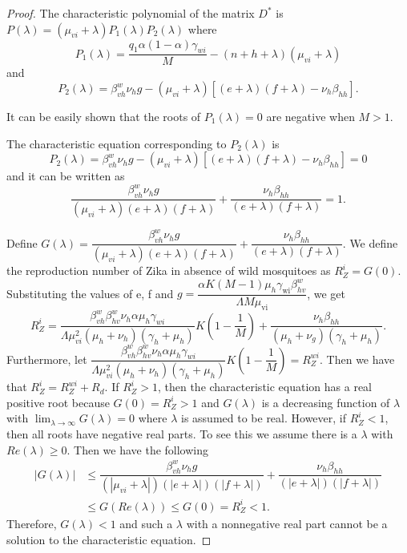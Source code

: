 \documentclass{ws-rv9x6}
\begin{document}
\begin{proof}
The characteristic polynomial of the matrix $D^*$ is $P(\lambda)=(\mu_{vi}+\lambda)P_1(\lambda)P_2(\lambda)$
where $$P_1(\lambda)= \dfrac{q_1\alpha(1-\alpha)\gamma_{wi}}{M}-(n+h+\lambda)(\mu_{vi}+\lambda)$$ and $$P_2(\lambda)=\beta^w_{vh}\nu_h g-(\mu_{vi}+\lambda)[(e+\lambda)(f+\lambda)-\nu_h\beta_{hh}].$$

\noindent It can be easily shown that the roots of $P_1(\lambda)=0$ are negative when $M > 1$.

The characteristic equation corresponding to $P_2(\lambda)$ is 
$$P_2(\lambda)=\beta^w_{vh}\nu_h g-(\mu_{vi}+\lambda)[(e+\lambda)(f+\lambda)-\nu_h\beta_{hh}]=0$$
and it can be written as
$$\dfrac{\beta^w_{vh}\nu_h g}{(\mu_{vi}+\lambda)(e+\lambda)(f+\lambda)}+\dfrac{\nu_h\beta_{hh}}{(e+\lambda)(f+\lambda)}=1.$$

\noindent Define
    $G(\lambda) = \dfrac{\beta^w_{vh}\nu_h g}{(\mu_{vi}+\lambda)(e+\lambda)(f+\lambda)}+\dfrac{\nu_h\beta_{hh}}{(e+\lambda)(f+\lambda)}$.
    We define the reproduction number of Zika in absence of wild mosquitoes as $R_Z^i=G(0)$. Substituting the values of e, f and $g=\dfrac{\alpha  K (M-1) \mu_h \gamma_{\text{wi}} \beta^w_{hv}}{\Lambda  M \mu_{\text{vi}}}$, we get
$$R_Z^i=\dfrac{\beta^w_{vh}\beta^w_{hv}\nu_h\alpha \mu_h\gamma_{wi}}{\Lambda \mu^2_{vi}(\mu_h+\nu_h)(\gamma_h+\mu_h)}K\left(1-\dfrac{1}{M}\right)+\dfrac{\nu_h\beta_{hh}}{(\mu_h+\nu_g)(\gamma_h+\mu_h)}.$$ Furthermore, let $\dfrac{\beta^w_{vh}\beta^w_{hv}\nu_h\alpha \mu_h\gamma_{wi}}{\Lambda \mu^2_{vi}(\mu_h+\nu_h)(\gamma_h+\mu_h)}K\left(1-\dfrac{1}{M}\right)=R_Z^{wi}$. Then we have that $R_Z^i=R_Z^{wi}+R_d$. If $R_Z^i > 1$, then the characteristic equation has a real positive root because $G(0)=R_Z^i>1$ and $G(\lambda)$ is a decreasing function of $\lambda$ with $\lim_{\lambda \to \infty}G(\lambda)=0$ where $\lambda$ is assumed to be real. However, if $R_Z^i <1$, then all roots have negative real parts. To see this we assume there is a $\lambda$ with $Re(\lambda) \geq 0$. Then we have the following
\begin{align*}
|G(\lambda)|&\leq \dfrac{\beta^w_{vh}\nu_h g}{(|\mu_{vi}+\lambda|)(|e+\lambda|)(|f+\lambda|)}+\dfrac{\nu_h\beta_{hh}}{(|e+\lambda|)(|f+\lambda|)}\\
    & \leq G(Re(\lambda)) \leq G(0)=R_Z^{i}<1.
\end{align*}  
Therefore, $G(\lambda)<1$ and such a $\lambda$ with a nonnegative real part cannot be a solution to the characteristic equation.

\end{proof}
\end{document}
